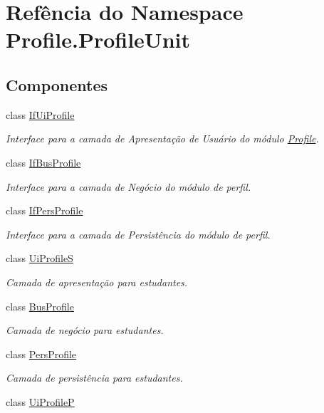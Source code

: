 \hypertarget{namespaceProfile_1_1ProfileUnit}{\section{Refência do Namespace Profile.\-Profile\-Unit}
\label{namespaceProfile_1_1ProfileUnit}
}
\subsection*{Componentes}
\begin{DoxyCompactItemize}
\item 
class \hyperlink{classProfile_1_1ProfileUnit_1_1IfUiProfile}{If\-Ui\-Profile}
\begin{DoxyCompactList}\small\item\em Interface para a camada de Apresentação de Usuário do módulo \hyperlink{namespaceProfile}{Profile}. \end{DoxyCompactList}\item 
class \hyperlink{classProfile_1_1ProfileUnit_1_1IfBusProfile}{If\-Bus\-Profile}
\begin{DoxyCompactList}\small\item\em Interface para a camada de Negócio do módulo de perfil. \end{DoxyCompactList}\item 
class \hyperlink{classProfile_1_1ProfileUnit_1_1IfPersProfile}{If\-Pers\-Profile}
\begin{DoxyCompactList}\small\item\em Interface para a camada de Persistência do módulo de perfil. \end{DoxyCompactList}\item 
class \hyperlink{classProfile_1_1ProfileUnit_1_1UiProfileS}{Ui\-Profile\-S}
\begin{DoxyCompactList}\small\item\em Camada de apresentação para estudantes. \end{DoxyCompactList}\item 
class \hyperlink{classProfile_1_1ProfileUnit_1_1BusProfile}{Bus\-Profile}
\begin{DoxyCompactList}\small\item\em Camada de negócio para estudantes. \end{DoxyCompactList}\item 
class \hyperlink{classProfile_1_1ProfileUnit_1_1PersProfile}{Pers\-Profile}
\begin{DoxyCompactList}\small\item\em Camada de persistência para estudantes. \end{DoxyCompactList}\item 
class \hyperlink{classProfile_1_1ProfileUnit_1_1UiProfileP}{Ui\-Profile\-P}
\end{DoxyCompactItemize}
